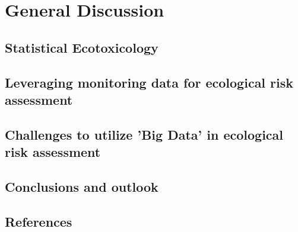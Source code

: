 \chapter{General Discussion}
\label{sec:discussion} 
 
\section{Statistical Ecotoxicology}




\section{Leveraging monitoring data for ecological risk assessment}



\section{Challenges to utilize 'Big Data' in ecological risk assessment}




\section{Conclusions and outlook}




\section{References}
\printbibliography[heading=none, sorting=nyt]
